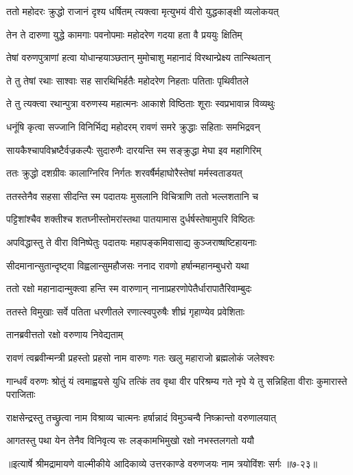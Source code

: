 \twolineshloka
{ततो महोदरः क्रुद्धो राजानं दृश्य धर्षितम्}
{त्यक्त्वा मृत्युभयं वीरो युद्धकाङ्क्षी व्यलोकयत्} %

\twolineshloka
{तेन ते दारुणा युद्धे कामगाः पवनोपमाः}
{महोदरेण गदया हता वै प्रययुः क्षितिम्} %

\twolineshloka
{तेषां वरुणपुत्राणां हत्वा योधान्हयाञ्छतान्}
{मुमोचाशु महानादं विरथान्प्रेक्ष्य तान्स्थितान्} %

\twolineshloka
{ते तु तेषां रथाः साश्वाः सह सारथिभिर्हतैः}
{महोदरेण निहताः पतिताः पृथिवीतले} %

\twolineshloka
{ते तु त्यक्त्वा रथान्पुत्रा वरुणस्य महात्मनः}
{आकाशे विष्ठिताः शूराः स्वप्रभावान्न विव्यथुः} %

\twolineshloka
{धनूंषि कृत्वा सज्जानि विनिर्भिद्य महोदरम्}
{रावणं समरे क्रुद्धाः सहिताः समभिद्रवन्} %

\twolineshloka
{सायकैश्चापविभ्रष्टैर्वज्रकल्पैः सुदारुणैः}
{दारयन्ति स्म सङ्क्रुद्धा मेघा इव महागिरिम्} %

\twolineshloka
{ततः क्रुद्धो दशग्रीवः कालाग्निरिव निर्गतः}
{शरवर्षैर्महाघोरैस्तेषां मर्मस्वताडयत्} %

\twolineshloka
{ततस्तेनैव सहसा सीदन्ति स्म पदातयः}
{मुसलानि विचित्राणि ततो भल्लशतानि च} %

\twolineshloka
{पट्टिशांश्चैव शक्तीश्च शतघ्नीस्तोमरांस्तथा}
{पातयामास दुर्धर्षस्तेषामुपरि विष्ठितः} %

\twolineshloka
{अपविद्धास्तु ते वीरा विनिष्पेतुः पदातयः}
{महापङ्कमिवासाद्य कुञ्जराष्षष्टिहायनाः} %

\twolineshloka
{सीदमानान्सुतान्दृष्ट्वा विह्वलान्सुमहौजसः}
{ननाद रावणो हर्षान्महानम्बुधरो यथा} %

\twolineshloka
{ततो रक्षो महानादान्मुक्त्वा हन्ति स्म वारुणान्}
{नानाप्रहरणोपेतैर्धारापातैरिवाम्बुदः} %

\twolineshloka
{ततस्ते विमुखाः सर्वे पतिता धरणीतले}
{रणात्स्वपुरुषैः शीघ्रं गृहाण्येव प्रवेशिताः} %

\onelineshloka
{तानब्रवीत्ततो रक्षो वरुणाय निवेद्यताम्} %

\twolineshloka
{रावणं त्वब्रवीन्मन्त्री प्रहस्तो प्रहसो नाम वारुणः}
{गतः खलु महाराजो ब्रह्मलोकं जलेश्वरः} %

\threelineshloka
{गान्धर्वं वरुणः श्रोतुं यं त्वमाह्वयसे युधि}
{तत्किं तव वृथा वीर परिश्रम्य गते नृपे}
{ये तु सन्निहिता वीराः कुमारास्ते पराजिताः} %

\twolineshloka
{राक्षसेन्द्रस्तु तच्छ्रुत्वा नाम विश्राव्य चात्मनः}
{हर्षान्नादं विमुञ्चन्वै निष्क्रान्तो वरुणालयात्} %

\twolineshloka
{आगतस्तु पथा येन तेनैव विनिवृत्य सः}
{लङ्कामभिमुखो रक्षो नभस्तलगतो ययौ} %


॥इत्यार्षे श्रीमद्रामायणे वाल्मीकीये आदिकाव्ये उत्तरकाण्डे वरुणजयः नाम त्रयोविंशः सर्गः ॥७-२३॥
